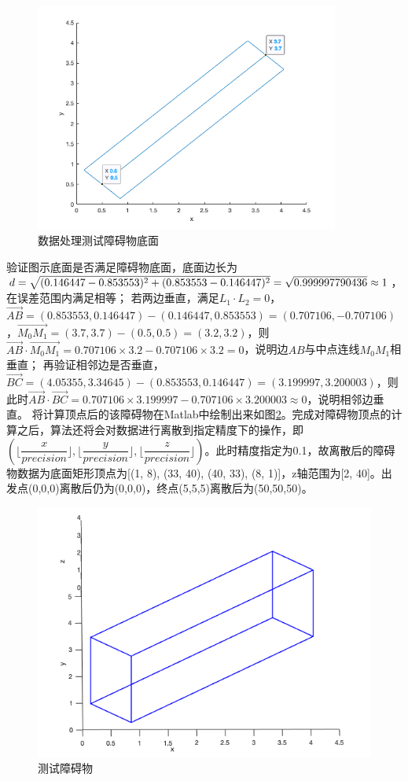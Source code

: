 \begin{figure}[htb]
    \centering
    \caption{数据处理测试障碍物底面}
    \label{fig:obstacle_ex_bottom}
    \includegraphics[width=10cm]{figures/obstacle_ex_bottom.png}
\end{figure}
\par 验证图示底面是否满足障碍物底面，底面边长为$d=\\\sqrt{(0.146447-0.853553)^2+(0.853553-0.146447)^2}=\sqrt{0.999997790436}\approx 1$，在误差范围内满足相等；
若两边垂直，满足$L_1\cdot L_2=0$，$\vec{AB}=(0.853553, 0.146447)-(0.146447, 0.853553)=(0.707106,-0.707106)$，$\vec{M_0M_1}=(3.7,3.7)-(0.5,0.5)=(3.2,3.2)$，则$\vec{AB}\cdot\vec{M_0M_1}=0.707106\times3.2-0.707106\times3.2=0$，说明边$AB$与中点连线$M_0M_1$相垂直；
再验证相邻边是否垂直，$\vec{BC}=(4.05355, 3.34645)-(0.853553, 0.146447)=(3.199997,3.200003)$，则此时$\vec{AB}\cdot\vec{BC}=0.707106\times3.199997-0.707106\times3.200003\approx0$，说明相邻边垂直。
将计算顶点后的该障碍物在Matlab中绘制出来如图\ref{fig:obstacle_ex}。完成对障碍物顶点的计算之后，算法还将会对数据进行离散到指定精度下的操作，即$(\lfloor\dfrac{x}{precision}\rfloor,\lfloor\dfrac{y}{precision}\rfloor,\lfloor\dfrac{z}{precision}\rfloor)$。此时精度指定为0.1，故离散后的障碍物数据为底面矩形顶点为[(1, 8), (33, 40), (40, 33), (8, 1)]，z轴范围为[2, 40]。出发点(0,0,0)离散后仍为(0,0,0)，终点(5,5,5)离散后为(50,50,50)。
\begin{figure}[htb]
    \centering
    \caption{测试障碍物}
    \label{fig:obstacle_ex}
    \includegraphics[width=12cm]{figures/obstacle_ex.png}
\end{figure}

